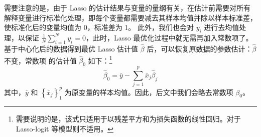 需要注意的是，由于 Lasso 的估计结果与变量的量纲有关，在估计前需要对所有解释变量进行标准化处理，即每个变量都需要减去其样本均值并除以样本标准差，使标准化后的变量均值为 0，标准差为 1。 %
此外，我们也会对 $y_{i}$ 进行去均值处理，以保证 $\frac{1}{N} \sum_{i=1}^{N} y_{i}=0$，此时，Lasso 最优化过程中就无需再加入常数项了。
基于中心化后的数据得到最优 Lasso 估计值 $\widehat{\beta}$ 后，可以恢复原数据的参数估计：$\widehat{\beta}$ 不变，常数项 的估计值 $\widehat{\beta}_{0}$ 如下：\footnote{%
  需要说明的是，该式只适用于以残差平方和为损失函数的线性回归。对于 Lasso-logit 等模型则不适用。}
$$
\widehat{\beta}_{0}=\bar{y}-\sum_{j=1}^{p} \bar{x}_{j} \widehat{\beta}_{j}
$$
其中，$\bar{y}$ 和 $\left\{\bar{x}_{j}\right\}_{1}^{p}$ 为原变量的样本均值。因此，后文中我们会略去常数项 $\beta_{0}$。

